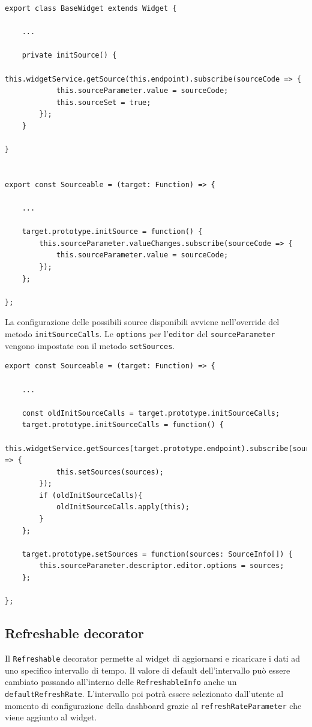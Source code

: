 \begin{lstlisting}[caption={Metodo initSource e override}, style=javaScriptCode]
export class BaseWidget extends Widget {
    
    ...
    
    private initSource() {
        this.widgetService.getSource(this.endpoint).subscribe(sourceCode => {
            this.sourceParameter.value = sourceCode;
            this.sourceSet = true;
        });
    }
    
}


export const Sourceable = (target: Function) => {

    ...

    target.prototype.initSource = function() {
        this.sourceParameter.valueChanges.subscribe(sourceCode => {
            this.sourceParameter.value = sourceCode;
        });
    };

};
\end{lstlisting}
La configurazione delle possibili source disponibili avviene nell'override del metodo \verb|initSourceCalls|. Le \verb|options| per l'\verb|editor| del \verb|sourceParameter| vengono impostate con il metodo \verb|setSources|.

\begin{lstlisting}[caption={Metodo setSources e override del metodo initSourceCalls all'interno del Sourceable Decorator}, style=javaScriptCode]
export const Sourceable = (target: Function) => {

    ...
    
    const oldInitSourceCalls = target.prototype.initSourceCalls;
    target.prototype.initSourceCalls = function() {
        this.widgetService.getSources(target.prototype.endpoint).subscribe(sources => {
            this.setSources(sources);
        });
        if (oldInitSourceCalls){
            oldInitSourceCalls.apply(this);
        }
    };

    target.prototype.setSources = function(sources: SourceInfo[]) {
        this.sourceParameter.descriptor.editor.options = sources;
    };

};
\end{lstlisting}
\subsection{Refreshable decorator}
Il \verb|Refreshable| decorator permette al widget di aggiornarsi e ricaricare i dati ad uno specifico intervallo di tempo. Il valore di default dell'intervallo può essere cambiato passando all'interno delle \verb|RefreshableInfo| anche un \verb|defaultRefreshRate|.
L'intervallo poi potrà essere selezionato dall'utente al momento di configurazione della dashboard grazie al \verb|refreshRateParameter| che viene aggiunto al widget.

